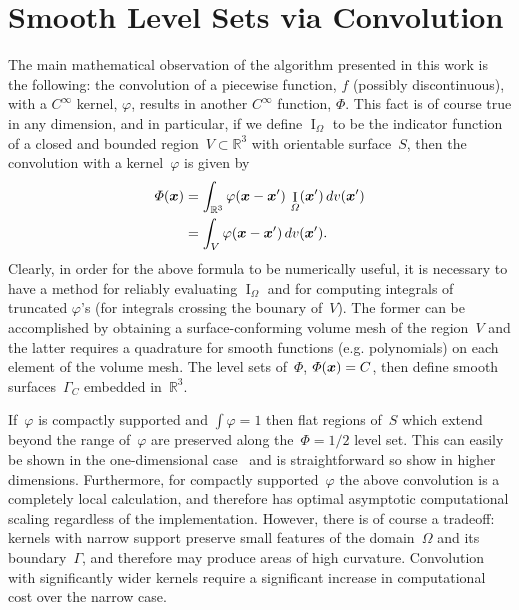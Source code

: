 \documentclass[11pt]{article}
\numberwithin{equation}{section}
\newcommand{\vct}{\vectorsym}
\DeclareMathOperator\indic{I}
\newcommand\bbR{\mathbb R}
\newcommand\bx{\vct{x}}
\renewcommand{\phi}{\varphi}
\begin{document}
\section{Smooth Level Sets via Convolution}
\label{sec:smooth}

The main mathematical observation of the algorithm presented in this
work is the following: the convolution of a piecewise function, $f$
(possibly discontinuous), with a $C^\infty$ kernel, $\phi$, results in
another $C^\infty$ function, $\Phi$. This fact is of course true in any
dimension, and in particular, if we define $\indic_\Omega$ to be the
indicator function of a closed and bounded
region~$V \subset \bbR^3$ with orientable surface~$S$, then
the convolution with a kernel~$\phi$ is given by
\begin{equation}
\begin{aligned}
\Phi(\bx) &= \int_{\bbR^3} \phi(\bx-\bx') \, \indic_\Omega(\bx') \, dv(\bx') \\
 &= \int_{V} \phi(\bx-\bx')  \, dv(\bx').
\end{aligned}
\end{equation}
Clearly, in order for the above formula to be numerically useful, it
is necessary to have a method for reliably evaluating $\indic_\Omega$
and for computing integrals of truncated $\phi$'s (for integrals
crossing the bounary of~$V$). The former can be
accomplished by obtaining a surface-conforming volume mesh of the
region~$V$ and the latter requires a quadrature for smooth
functions (e.g. polynomials) on each element of the volume mesh. The
level sets of~$\Phi$, $\Phi(\bx) = C$, then define smooth
surfaces~$\Gamma_C$ embedded in~$\bbR^3$.

If~$\phi$ is compactly supported and $\int \phi = 1$ then flat regions
of~$S$ which extend beyond the range of~$\phi$ are preserved
along the~$\Phi = 1/2$ level set. This can easily be shown in the
one-dimensional case~\cite{epstein_2016} and is straightforward so
show in higher dimensions. Furthermore, for compactly supported~$\phi$
the above convolution is a completely local calculation, and therefore
has optimal asymptotic computational scaling regardless of the
implementation. However, there is of course a tradeoff: kernels with
narrow support preserve small features of the domain~$\Omega$ and its
boundary~$\Gamma$, and therefore may produce areas of high
curvature. Convolution with significantly wider kernels require a
significant increase in computational cost over the narrow case.
\end{document}
